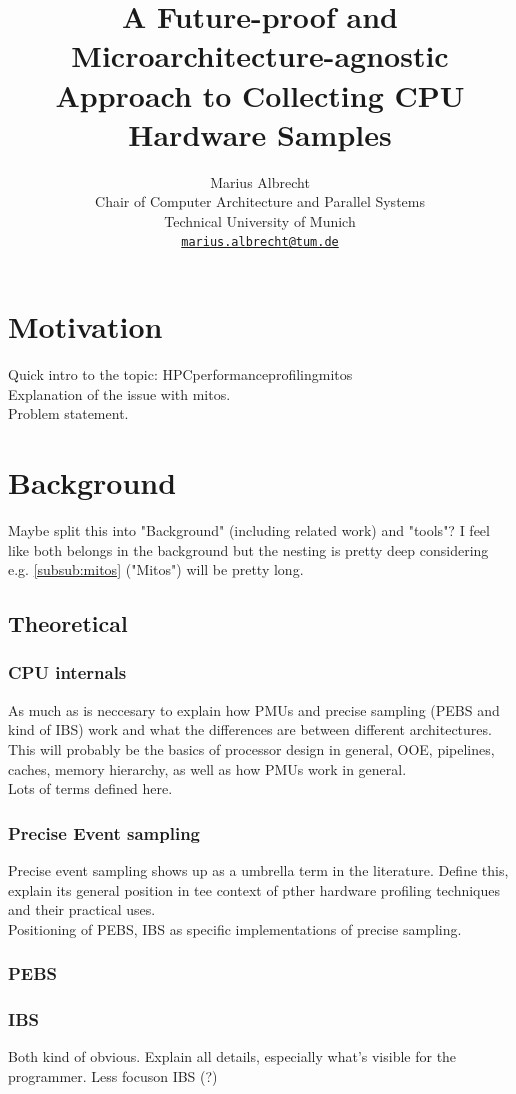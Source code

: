 \documentclass[11pt, a4paper]{article}
\title{A Future-proof and Microarchitecture-agnostic Approach to Collecting CPU Hardware Samples}
\author{
    Marius Albrecht \\
    Chair of Computer Architecture and Parallel Systems \\
    Technical University of Munich \\
    \href{mailto:marius.albrecht@tum.de}{\texttt{marius.albrecht@tum.de}}
}
\date{}
\begin{document}
\maketitle

\section{Motivation}

Quick intro to the topic: HPC\textrightarrow performance\textrightarrow profiling\textrightarrow mitos \\
Explanation of the issue with mitos. \\
Problem statement.

\section{Background}
Maybe split this into "Background" (including related work) and "tools"? I feel like both belongs in the background but the nesting is pretty deep considering e.g. \ref{subsub:mitos} ("Mitos") will be pretty long.
\subsection{Theoretical}
\subsubsection{CPU internals}
As much as is neccesary to explain how PMUs and precise sampling (PEBS and kind of IBS) work and what the differences are between different architectures. \\
This will probably be the basics of processor design in general, OOE, pipelines, caches, memory hierarchy, as well as how PMUs work in general. \\
Lots of terms defined here.
\subsubsection{Precise Event sampling}
Precise event sampling shows up as a umbrella term in the literature. Define this, explain its general position in tee context of pther hardware profiling techniques and their practical uses. \\
Positioning of PEBS, IBS as specific implementations of precise sampling.
\subsubsection{PEBS}
\subsubsection{IBS}
Both kind of obvious. Explain all details, especially what's visible for the programmer. Less focuson IBS (?)
\end{document}
